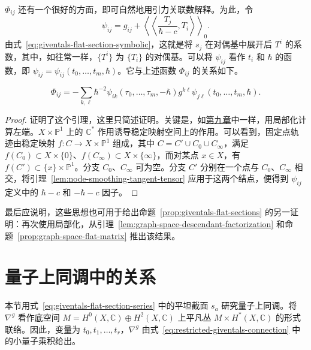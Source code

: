 $\Phi_{ij}$ 还有一个很好的方面，即可自然地用引力关联数解释。为此，令
\[
\psi_{ij}=g_{ij}+\left\langle\!\left\langle\frac{T_j}{\hbar-c},T_i\right\rangle\!\right\rangle_0.
\]
由式~\eqref{eq:giventals-flat-section-symbolic}，这就是将 $s_j$ 在对偶基中展开后 $T^i$ 的系数，其中，如往常一样，$\{T^i\}$ 为 $\{T_i\}$ 的对偶基。可以将 $\psi_{ij}$ 看作 $t_i$ 和 $\hbar$ 的函数，即 $\psi_{ij}=\psi_{ij}(t_0,\ldots,t_m,\hbar)$。它与上述函数 $\Phi_{ij}$ 的关系如下。
\begin{lemma}\label{lem:graph-space-descendant-factorization}
\[
\Phi_{ij}=-\sum_{k,\ell}\hbar^{-2}
\psi_{ik}(\tau_0,\ldots,\tau_m,-\hbar)g^{k\ell}
\psi_{j\ell}(t_0,\ldots,t_m,\hbar).
\]
\end{lemma}
\begin{proof}
 证明了这个引理，这里只简述证明。关键是，如\hyperref[chap:localization]{第九章}中一样，用局部化计算左端。$X\times\mathbb P^1$ 上的 $\mathbb C^*$ 作用诱导稳定映射空间上的作用。可以看到，固定点轨迹由稳定映射 $f:C\to X\times\mathbb P^1$ 组成，其中 $C=C'\cup C_0\cup C_\infty$，满足 $f(C_0)\subset X\times\{0\}$、$f(C_\infty)\subset X\times\{\infty\}$，而对某点 $x\in X$，有 $f(C')\subset\{x\}\times\mathbb P^1$。分支 $C_0$、$C_\infty$ 可为空。分支 $C'$ 分别在一个点与 $C_0$、$C_\infty$ 相交，将引理~\ref{lem:node-smoothing-tangent-tensor} 应用于这两个结点，便得到 $\psi_{ij}$ 定义中的 $\hbar-c$ 和 $-\hbar-c$ 因子。
\end{proof}

最后应说明，这些思想也可用于给出命题~\ref{prop:giventals-flat-sections} 的另一证明：再次使用局部化，从引理~\ref{lem:graph-space-descendant-factorization} 和命题~\ref{prop:graph-space-flat-matrix} 推出该结果。

\section{量子上同调中的关系}\label{sec:quantum-cohomology-relations}
本节用式~\eqref{eq:giventals-flat-section-series} 中的平坦截面 $s_a$ 研究量子上同调。将 $\nabla^g$ 看作底空间 $M=H^0(X,\mathbb C)\oplus H^2(X,\mathbb C)$ 上平凡丛 $M\times H^*(X,\mathbb C)$ 的形式联络。因此，变量为 $t_0,t_1,\ldots,t_r$，$\nabla^g$ 由式~\eqref{eq:restricted-giventals-connection} 中的小量子乘积给出。

